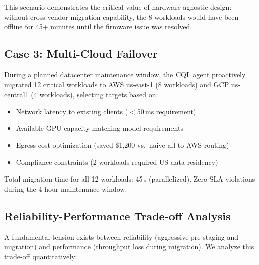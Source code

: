 \documentclass[conference,10pt,letterpaper]{IEEEtran}
\begin{document}
This scenario demonstrates the critical value of hardware-agnostic design: without cross-vendor migration capability, the 8 workloads would have been offline for 45+ minutes until the firmware issue was resolved.

\subsection{Case 3: Multi-Cloud Failover}

During a planned datacenter maintenance window, the CQL agent proactively migrated 12 critical workloads to AWS us-east-1 (8 workloads) and GCP us-central1 (4 workloads), selecting targets based on:
\begin{itemize}
\item Network latency to existing clients ($<$50\,ms requirement)
\item Available GPU capacity matching model requirements
\item Egress cost optimization (saved \$1,200 vs.\ naive all-to-AWS routing)
\item Compliance constraints (2 workloads required US data residency)
\end{itemize}

Total migration time for all 12 workloads: 45\,s (parallelized). Zero SLA violations during the 4-hour maintenance window.



\subsection{Reliability-Performance Trade-off Analysis}

A fundamental tension exists between reliability (aggressive pre-staging and migration) and performance (throughput loss during migration). We analyze this trade-off quantitatively:

\begin{table}[!t]
\caption{Reliability vs.\ Performance Trade-off}
\label{tab:tradeoff}
\centering\scriptsize
{}
\end{table}
\end{document}
